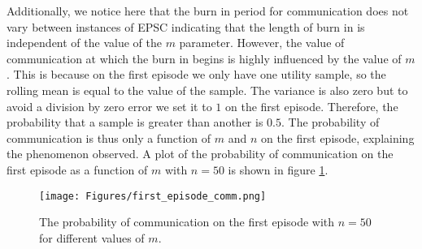 Additionally, we notice here that the burn in period for communication does not vary between instances of EPSC indicating that the length of burn in is independent of the value of the $m$ parameter. However, the value of communication at which the burn in begins is highly influenced by the value of $m$. This is because on the first episode we only have one utility sample, so the rolling mean is equal to the value of the sample. The variance is also zero but to avoid a division by zero error we set it to $1$ on the first episode. Therefore, the probability that a sample is greater than another is $0.5$. The probability of communication is thus only a function of $m$ and $n$ on the first episode, explaining the phenomenon observed. A plot of the probability of communication on the first episode as a function of $m$ with $n=50$ is shown in figure \ref{fig:EP1Comm}.

\begin{figure}
    \centering
    \texttt{[image: Figures/first\_episode\_comm.png]}
    \caption{The probability of communication on the first episode with $n=50$ for different values of $m$.}
    \label{fig:EP1Comm}
\end{figure}

